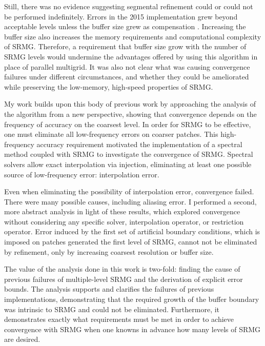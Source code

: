 \documentclass[final]{siamart1116}
\numberwithin{theorem}{section}
\begin{document}
    Still, there was no evidence suggesting segmental refinement could or could not be performed indefinitely. Errors in the 2015 implementation grew beyond acceptable levels unless the buffer size grew as compensation \cite{paper1}. Increasing the buffer size also increases the memory requirements and computational complexity of SRMG. Therefore, a requirement that buffer size grow with the number of SRMG levels would undermine the advantages offered by using this algorithm in place of parallel multigrid. It was also not clear what was causing convergence failures under different circumstances, and whether they could be ameliorated while preserving the low-memory, high-speed properties of SRMG. 
    
    My work builds upon this body of previous work by approaching the analysis of the algorithm from a new perspective, showing that convergence depends on the frequency of accuracy on the coarsest level. In order for SRMG to be effective, one must eliminate all low-frequency errors on coarser patches. This high-frequency accuracy requirement motivated the implementation of a spectral method coupled with SRMG to investigate the convergence of SRMG. Spectral solvers allow exact interpolation via injection, eliminating at least one possible source of low-frequency error: interpolation error. 
   
    
    Even when eliminating the possibility of interpolation error, convergence failed. There were many possible causes, including aliasing error. I performed a second, more abstract analysis in light of these results, which explored convergence without considering any specific solver, interpolation operator, or restriction operator. Error induced by the first set of artificial boundary conditions, which is imposed on patches generated the first level of SRMG, cannot not be eliminated by refinement, only by increasing coarsest resolution or buffer size.
    
    
    The value of the analysis done in this work is two-fold: finding the cause of previous failures of multiple-level SRMG and the derivation of explicit error bounds.  The analysis supports and clarifies the failures of previous implementations, demonstrating that the required growth of the buffer boundary \cite{paper1} was intrinsic to SRMG and could not be eliminated. Furthermore, it demonstrates exactly what requirements must be met in order to achieve convergence with SRMG when one knowns in advance how many levels of SRMG are desired. 
    
\end{document}
